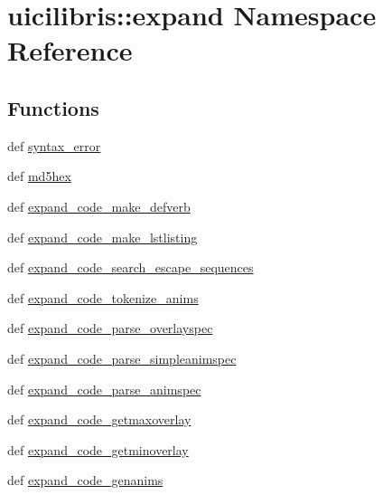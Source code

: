 \hypertarget{namespaceuicilibris_1_1expand}{\section{uicilibris\-:\-:expand \-Namespace \-Reference}
\label{namespaceuicilibris_1_1expand}
}
\subsection*{\-Functions}
\begin{DoxyCompactItemize}
\item 
def \hyperlink{namespaceuicilibris_1_1expand_a7c2e494ec8fac69541f38ff597769ea1}{syntax\-\_\-error}
\item 
def \hyperlink{namespaceuicilibris_1_1expand_aa7c5fb372f99423998ded9e3bc442bbe}{md5hex}
\item 
def \hyperlink{namespaceuicilibris_1_1expand_acd820eb2d190c4c0d186bb41d070e10e}{expand\-\_\-code\-\_\-make\-\_\-defverb}
\item 
def \hyperlink{namespaceuicilibris_1_1expand_a7d52c80223faaefc49dae45d367082e6}{expand\-\_\-code\-\_\-make\-\_\-lstlisting}
\item 
def \hyperlink{namespaceuicilibris_1_1expand_a85777fc13697754d6dd7e3fcd9a7f144}{expand\-\_\-code\-\_\-search\-\_\-escape\-\_\-sequences}
\item 
def \hyperlink{namespaceuicilibris_1_1expand_ad024d95772cf38f8738b402dee4db35a}{expand\-\_\-code\-\_\-tokenize\-\_\-anims}
\item 
def \hyperlink{namespaceuicilibris_1_1expand_a36db1d2ed68f45051157b7f0069b63bb}{expand\-\_\-code\-\_\-parse\-\_\-overlayspec}
\item 
def \hyperlink{namespaceuicilibris_1_1expand_a3adf073f866155a711055b9c0535bd41}{expand\-\_\-code\-\_\-parse\-\_\-simpleanimspec}
\item 
def \hyperlink{namespaceuicilibris_1_1expand_a91cba1a887bbe20573806b083121d6eb}{expand\-\_\-code\-\_\-parse\-\_\-animspec}
\item 
def \hyperlink{namespaceuicilibris_1_1expand_ad3fe792166190040fd892778baa7b447}{expand\-\_\-code\-\_\-getmaxoverlay}
\item 
def \hyperlink{namespaceuicilibris_1_1expand_af9cefca18c66f5901e9063457d69f9b4}{expand\-\_\-code\-\_\-getminoverlay}
\item 
def \hyperlink{namespaceuicilibris_1_1expand_a8e259c683afb687da2b775d152ff8e24}{expand\-\_\-code\-\_\-genanims}
\item 

\end{DoxyCompactItemize}
